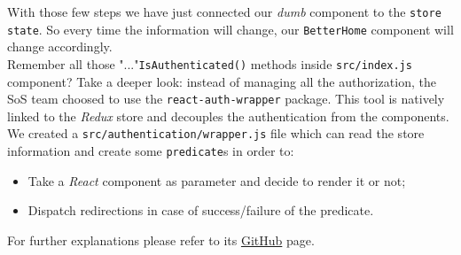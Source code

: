 With those few steps we have just connected our \emph{dumb} component to the \verb|store| \verb|state|. So every time the information will change, our \verb|BetterHome| component will change accordingly.
\\Remember all those "..."\verb|IsAuthenticated()| methods inside \verb|src/index.js| component? Take a deeper look: instead of managing all the authorization, the SoS team choosed to use the \verb|react-auth-wrapper| package. This tool is natively linked to the \emph{Redux} store and decouples the authentication from the components. We created a \verb|src/authentication/wrapper.js| file which can read the store information  and create some \verb|predicate|s in order to:
\begin{itemize}
	\item Take a \emph{React} component as parameter and decide to render it or not;
	\item Dispatch redirections in case of success/failure of the predicate.
\end{itemize}
For further explanations please refer to its \href{https://github.com/mjrussell/redux-auth-wrapper}{GitHub} page.


